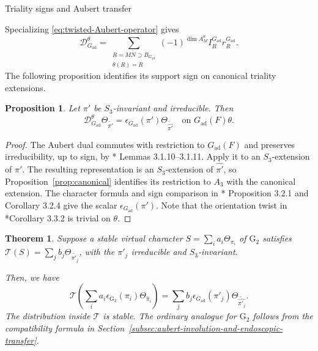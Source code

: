 \documentclass[12pt]{amsart}
\makeatletter
\renewcommand{\subsection}{\@startsection{subsection}{2}%
  \z@{.7\linespacing\@plus.5\linespacing}{.35\linespacing}%
  {\normalfont\bfseries\raggedright}}
\theoremstyle{definition}
\theoremstyle{plain}
\newtheorem{theorem}[definition]{Theorem}
\newtheorem{proposition}[definition]{Proposition}
\theoremstyle{remark}
\numberwithin{equation}{section}
\newcommand{\rG}{\mathrm{G}}
\makeatother
\begin{document}
\subsection{Triality signs and Aubert transfer}

Specializing \eqref{eq:twisted-Aubert-operator} gives
\[
 \mathcal D_{G_{\mathrm{ad}}}^\theta=
  \sum_{\substack{R=MN\supset B_{G_{\mathrm{ad}}}\\\theta(R)=R}}
    (-1)^{\dim A_M^\theta}I_R^{G_{\mathrm{ad}}}r_R^{G_{\mathrm{ad}}}.
\]
The following proposition identifies its support sign on canonical
triality extensions.

\begin{proposition}\label{prop:twisted-sign}
Let $\pi'$ be $S_3$-invariant and irreducible. Then
\begin{equation}\label{eq:twisted-sign}
 \mathcal D_{G_{\mathrm{ad}}}^\theta\Theta_{\widetilde{\pi'}}
       =\epsilon_{G_{\mathrm{ad}}}(\pi')\Theta_{\widetilde{\widehat{\pi'}}}
       \quad\text{on }G_{\mathrm{ad}}(F)\theta.
\end{equation}
\end{proposition}
\begin{proof}
The Aubert dual commutes with restriction to $G_{\mathrm{ad}}(F)$ and preserves
irreducibility, up to sign, by
\cite{ChengKaletha2026-AubertBernsteinInvolutionsDisconnectedGroups}*{
Lemmas 3.1.10--3.1.11}. Apply it to an $S_3$-extension of $\pi'$.
The resulting representation is an $S_3$-extension of $\widehat{\pi'}$,
so Proposition~\ref{prop:canonical} identifies its restriction to $A_3$
with the canonical extension. The character formula and sign comparison
in \cite{ChengKaletha2026-AubertBernsteinInvolutionsDisconnectedGroups}*{
Proposition 3.2.1 and Corollary 3.2.4} give the scalar $\epsilon_{G_{\mathrm{ad}}}(\pi')$.
Note that the orientation twist in
\cite{ChengKaletha2026-AubertBernsteinInvolutionsDisconnectedGroups}*{Corollary 3.3.2}
is trivial on $\theta$.
\end{proof}

\begin{theorem}\label{thm:signed-transfer}
Suppose a stable virtual character $S=\sum_i a_i\Theta_{\pi_i}$ of ${\rG_2}$
satisfies
$\mathcal T(S)=\sum_j b_j\Theta_{\widetilde{\pi'_j}}$, with the
$\pi'_j$ irreducible and $S_3$-invariant. 

Then, we have
\begin{equation}\label{eq:signed-transfer}
 \mathcal T\left(\sum_i a_i\epsilon_{\rG_2}(\pi_i)
                         \Theta_{\widehat\pi_i}\right)
  =\sum_j b_j \epsilon_{G_{\mathrm{ad}}}(\pi'_j)
       \Theta_{\widetilde{\widehat{\pi'_j}}}.
\end{equation}
The distribution inside $\mathcal T$ is stable. The ordinary analogue for $\rG_2$ follows from the compatibility formula in Section~\ref{subsec:aubert-involution-and-endoscopic-transfer}.
\end{theorem}
\end{document}
